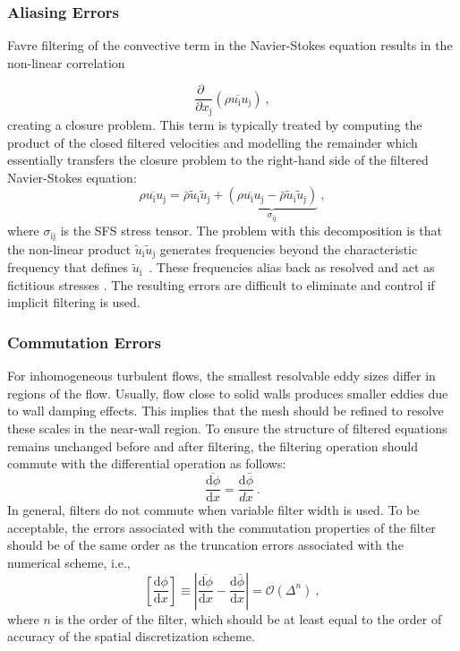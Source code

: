 \subsubsection{Aliasing Errors} \label{section:aliasing_errors}
Favre filtering of the convective term in the Navier-Stokes equation results in the non-linear correlation\par
\begin{equation}
 \frac{\partial \;\;}{\partial x_\mathrm{j}} (\overline{\rho u_\mathrm{i} u_\mathrm{j}}) \: ,
 \end{equation}
creating a closure problem. This term is typically treated by computing the product of the closed filtered velocities and modelling the remainder which essentially transfers the closure problem to the right-hand side of the filtered Navier-Stokes equation:
\begin{equation}
\overline{\rho u_\mathrm{i} u_\mathrm{j}} = \bar{\rho} \tilde{u}_\mathrm{i} \tilde{u}_\mathrm{j} 
+\underbrace{ (\overline{\rho u_\mathrm{i} u_\mathrm{j}} - \bar{\rho} \tilde{u}_\mathrm{i} \tilde{u}_\mathrm{j} ) }_{\sigma_\mathrm{ij}} \: ,
\end{equation}
where $\sigma_\mathrm{ij}$ is the SFS stress tensor. The problem with this decomposition is that the non-linear product $\tilde{u}_\mathrm{i} \tilde{u}_\mathrm{j}$ generates frequencies beyond the characteristic frequency that defines $\tilde{u}_\mathrm{i}$~. These frequencies alias back as resolved and act as fictitious stresses \cite{Lund:03}.
The resulting errors are difficult to eliminate and control if implicit filtering is used.\par

\subsubsection{Commutation Errors} \label{section:commutation_errors}
For inhomogeneous turbulent flows, the smallest resolvable eddy sizes differ in regions of the flow. Usually, flow close to solid walls  produces smaller  eddies due to wall damping effects. This implies that the mesh should be refined to resolve these scales in the near-wall region. To ensure the structure of filtered equations remains unchanged before and after filtering, the filtering operation should commute with the differential operation as follows:
\begin{equation} 
\overline{\frac{\mathrm{d} \phi}{\mathrm{d} x} } = \frac{\mathrm{d} \bar{\phi}}{dx} \: .
\end{equation}
In general, filters do not commute when variable filter width is used. To be acceptable, the errors associated with the commutation properties of the filter should be of the same order as the truncation errors associated with the numerical scheme, i.e.,
 \begin{equation} \label{eq:commutation_error}
\left[ \frac{\mathrm{d} \phi}{\mathrm{d} x}   \right]  \equiv \left| \overline{\frac{\mathrm{d} \phi}{\mathrm{d} x} } - \frac{\mathrm{d} \bar{\phi}}{\mathrm{d}x}\right| = \mathcal{O}(\Delta^n) \: ,
\end{equation}
 where $n$ is the order of the filter, which should be at least equal to the order of accuracy of the spatial discretization scheme.


